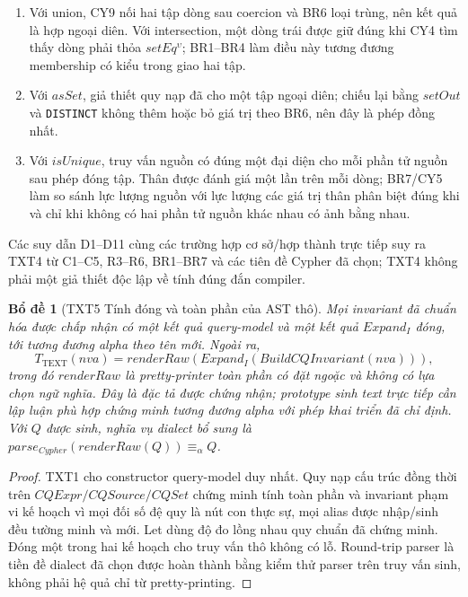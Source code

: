 \documentclass[11pt,a4paper]{article}
\newtheorem{lemma}{Bổ đề}
\theoremstyle{definition}
\begin{document}
\begin{enumerate}[label=(D\arabic*)]
  các giá trị phần tử.
  \item Với union, CY9 nối hai tập dòng sau coercion và BR6 loại trùng, nên kết
  quả là hợp ngoại diên. Với intersection, một dòng trái được giữ đúng khi
  CY4 tìm thấy dòng phải thỏa $setEq^\upsilon$; BR1--BR4 làm điều này tương
  đương membership có kiểu trong giao hai tập.
  \item Với $asSet$, giả thiết quy nạp đã cho một tập ngoại diên; chiếu lại
  bằng $setOut$ và \texttt{DISTINCT} không thêm hoặc bỏ giá trị theo BR6, nên
  đây là phép đồng nhất.
  \item Với $isUnique$, truy vấn nguồn có đúng một đại diện cho mỗi phần tử
  nguồn sau phép đóng tập. Thân được đánh giá một lần trên mỗi dòng; BR7/CY5
  làm so sánh lực lượng nguồn với lực lượng các giá trị thân phân biệt đúng khi
  và chỉ khi không có hai phần tử nguồn khác nhau có ảnh bằng nhau.
\end{enumerate}
Các suy dẫn D1--D11 cùng các trường hợp cơ sở/hợp thành trực tiếp suy ra TXT4 từ
C1--C5, R3--R6, BR1--BR7 và các tiên đề Cypher đã chọn; TXT4 không phải một giả
thiết độc lập về tính đúng đắn compiler.

\begin{lemma}[TXT5 Tính đóng và toàn phần của AST thô]
Mọi invariant đã chuẩn hóa được chấp nhận có một kết quả query-model và một kết
quả $Expand_I$ đóng, tới tương đương alpha theo tên mới. Ngoài ra,
\[
T_{\mathrm{TEXT}}(nva)=renderRaw(Expand_I(BuildCQInvariant(nva))),
\]
trong đó $renderRaw$ là pretty-printer toàn phần có đặt ngoặc và không có lựa
chọn ngữ nghĩa. Đây là đặc tả được chứng nhận; prototype sinh text trực tiếp
cần lập luận phù hợp chứng minh tương đương alpha với phép khai triển đã chỉ
định. Với $Q$ được sinh, nghĩa vụ dialect bổ sung là
$parse_{Cypher}(renderRaw(Q))\equiv_{\alpha}Q$.
\end{lemma}
\begin{proof}
TXT1 cho constructor query-model duy nhất. Quy nạp cấu trúc đồng thời trên
$CQExpr/CQSource/CQSet$ chứng minh tính toàn phần và invariant phạm vi kế hoạch
vì mọi đối số đệ quy là nút con thực sự, mọi alias được nhập/sinh đều tường minh
và mới. Let dùng độ đo lồng nhau quy chuẩn đã chứng minh. Đóng một trong hai kế
hoạch cho truy vấn thô không có lỗ. Round-trip parser là tiền đề dialect đã chọn
được hoàn thành bằng kiểm thử parser trên truy vấn sinh, không phải hệ quả chỉ
từ pretty-printing.
\end{proof}
\end{document}
